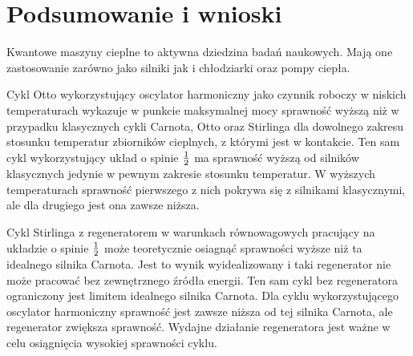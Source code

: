 \chapter{Podsumowanie i wnioski}

Kwantowe maszyny cieplne to aktywna dziedzina badań naukowych. Mają one zastosowanie zarówno jako silniki jak i chłodziarki oraz pompy ciepła.

Cykl Otto wykorzystujący oscylator harmoniczny jako czynnik roboczy w niskich temperaturach wykazuje w punkcie maksymalnej mocy sprawność wyższą niż w przypadku klasycznych cykli Carnota, Otto oraz Stirlinga dla dowolnego zakresu stosunku temperatur zbiorników cieplnych, z którymi jest w kontakcie. Ten sam cykl wykorzystujący układ o spinie \(\frac{1}{2}\) ma sprawność wyższą od silników klasycznych jedynie w pewnym zakresie stosunku temperatur. W wyższych temperaturach sprawność pierwszego z nich pokrywa się z silnikami klasycznymi, ale dla drugiego jest ona zawsze niższa. 

Cykl Stirlinga z regeneratorem w warunkach równowagowych pracujący na układzie o spinie \(\frac{1}{2}\) może teoretycznie osiagnąć sprawności wyższe niż ta idealnego silnika Carnota. Jest to wynik wyidealizowany i taki regenerator nie może pracować bez zewnętrznego źródła energii. Ten sam cykl bez regeneratora ograniczony jest limitem idealnego silnika Carnota. Dla cyklu wykorzystującego oscylator harmoniczny sprawność jest zawsze niższa od tej silnika Carnota, ale regenerator zwiększa sprawność. Wydajne działanie regeneratora jest ważne w celu osiągnięcia wysokiej sprawności cyklu.